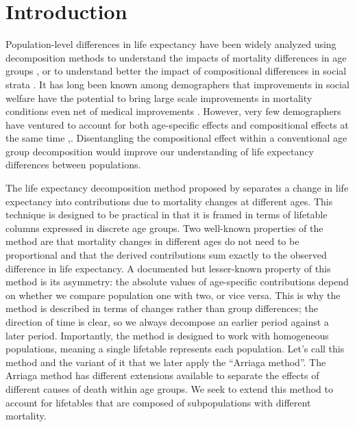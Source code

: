\documentclass[12pt, sn-apa,pdflatex,letterpaper]{sn-jnl}
\begin{document}
\section*{Introduction}\label{intro}

Population-level differences in life expectancy have been widely analyzed using decomposition methods to understand the impacts of mortality differences in age groups \citep[e.g.,][]{arriaga1984measuring, pollard1988decomposition},  or \citet{kitagawa1955components} to understand better the impact of compositional differences in social strata \citep{kitagawa1977mortality}. It has long been known among demographers that improvements in social welfare have the potential to bring large scale improvements in mortality conditions even net of medical improvements \citep{kitagawa1968education}. However, very few demographers have ventured to account for both age-specific effects and compositional effects at the same time \citep{torres2019contribution, hendi2021immigration, su2023educational, su2024subnational},. Disentangling the compositional effect within a conventional age group decomposition would improve our understanding of life expectancy differences between populations. 

The life expectancy decomposition method proposed by \citet{arriaga1984measuring} separates a change in life expectancy into contributions due to mortality changes at different ages. This technique is designed to be practical in that it is framed in terms of lifetable columns expressed in discrete age groups. Two well-known properties of the method are that mortality changes in different ages do not need to be proportional and that the derived contributions sum exactly to the observed difference in life expectancy. A documented but lesser-known property of this method is its asymmetry: the absolute values of age-specific contributions depend on whether we compare population one with two, or vice versa. This is why the method is described in terms of changes rather than group differences; the direction of time is clear, so we always decompose an earlier period against a later period. Importantly, the method is designed to work with homogeneous populations, meaning a single lifetable represents each population. Let's call this method and the variant of it that we later apply the ``Arriaga method''. The Arriaga method has different extensions available to separate the effects of different causes of death within age groups. We seek to extend this method to account for lifetables that are composed of subpopulations with different mortality.
\end{document}
